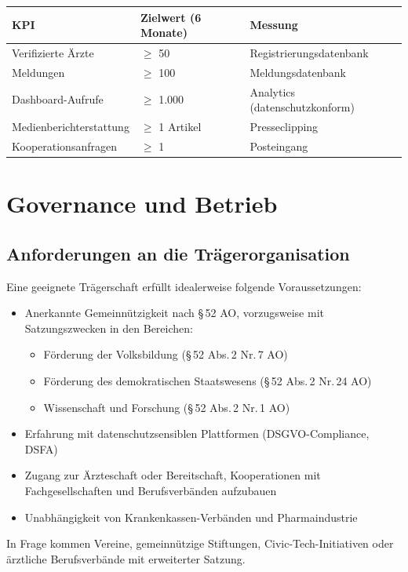 \documentclass{umbruch-position}
\begin{document}
{\small
\begin{tabularx}{\textwidth}{X X X}
\toprule
\textbf{KPI} & \textbf{Zielwert (6 Monate)} & \textbf{Messung} \\
\midrule
Verifizierte Ärzte & $\ge$ 50 & Registrierungsdatenbank \\
Meldungen & $\ge$ 100 & Meldungsdatenbank \\
Dashboard-Aufrufe & $\ge$ 1.000 & Analytics (datenschutzkonform) \\
Medienberichterstattung & $\ge$ 1 Artikel & Presseclipping \\
Kooperationsanfragen & $\ge$ 1 & Posteingang \\
\bottomrule
\end{tabularx}
}



\section{Governance und Betrieb}

\subsection{Anforderungen an die Trägerorganisation}

Eine geeignete Trägerschaft erfüllt idealerweise folgende Voraussetzungen:

\begin{itemize}[nosep]
  \item Anerkannte Gemeinnützigkeit nach \S\,52 AO, vorzugsweise mit Satzungszwecken in den Bereichen:
  \begin{itemize}[nosep]
    \item Förderung der Volksbildung (\S\,52 Abs.\,2 Nr.\,7 AO)
    \item Förderung des demokratischen Staatswesens (\S\,52 Abs.\,2 Nr.\,24 AO)
    \item Wissenschaft und Forschung (\S\,52 Abs.\,2 Nr.\,1 AO)
  \end{itemize}
  \item Erfahrung mit datenschutzsensiblen Plattformen (DSGVO-Compliance, DSFA)
  \item Zugang zur Ärzteschaft oder Bereitschaft, Kooperationen mit Fachgesellschaften und Berufsverbänden aufzubauen
  \item Unabhängigkeit von Krankenkassen-Verbänden und Pharmaindustrie
\end{itemize}

In Frage kommen Vereine, gemeinnützige Stiftungen, Civic-Tech-Initiativen oder ärztliche Berufsverbände mit erweiterter Satzung.
\end{document}

